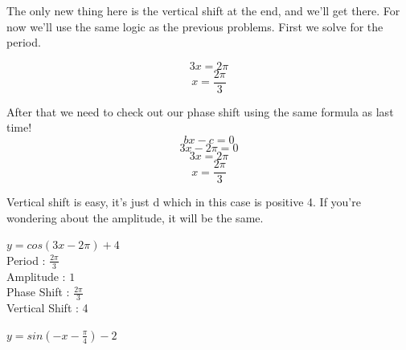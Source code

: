 \documentclass[10pt,letterpaper]{amspset}
\begin{document}
\begin{solution}[Solution]
    The only new thing here is the vertical shift at the end, and we'll get there. For now we'll use the same logic as the previous problems. First we solve for the period.
    
    \[ 3x = 2\pi \]
    \[\boxed{ x = \frac{2\pi}{3} }\]
    
    After that we need to check out our phase shift using the same formula as last time!
    \[ bx - c = 0 \]
    \[ 3x - 2\pi = 0 \]
    \[ 3x = 2\pi \]
    \[\boxed{ x = \frac{2\pi}{3} }\]
    
    Vertical shift is easy, it's just d which in this case is positive 4. If you're wondering about the amplitude, it will be the same. 
    
    \noindent $y = cos (3x - 2\pi) + 4$ \\[+2mm]
    Period : $\frac{2\pi}{3}$ \\[+2mm]
    Amplitude : $1$ \\[+2mm]
    Phase Shift : $\frac{2\pi}{3}$ \\[+2mm]
    Vertical Shift : 4 \\
   
   
\end{solution}


\pagebreak


\begin{problem}[9]
    $y = sin (-x - \frac{\pi}{4}) - 2$
\end{problem}
\end{document}
